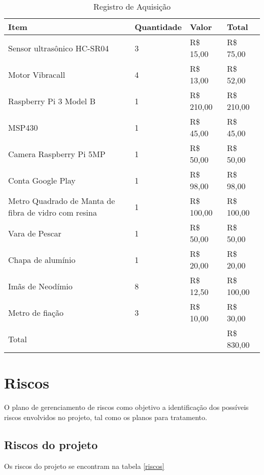 \begin{table}[ht]
    \centering
	\label{aqeletronica}
    \caption{Registro de Aquisição}
    \begin{tabular}{|p{2.0in}|p{0.8in}|p{0.7in}|p{1.0in}|}
        \hline
        Item & Quantidade & Valor & Total \\
        \hline
        Sensor ultrasônico HC-SR04 &  3 & R\$ 15,00 & R\$ 75,00 \\
        Motor Vibracall & 4 & R\$ 13,00 & R\$ 52,00 \\
        Raspberry Pi 3 Model B & 1 & R\$ 210,00 & R\$ 210,00 \\
        MSP430 & 1 & R\$ 45,00 & R\$ 45,00 \\
        Camera Raspberry Pi 5MP & 1 & R\$ 50,00 & R\$ 50,00 \\
        Conta Google Play & 1 & R\$ 98,00 & R\$ 98,00 \\
        Metro Quadrado de Manta de fibra de vidro com resina & 1 & R\$ 100,00 & R\$ 100,00 \\
        Vara de Pescar & 1 & R\$ 50,00 & R\$ 50,00 \\
        Chapa de alumínio & 1 & R\$ 20,00 & R\$ 20,00 \\
        Imãs de Neodímio & 8 & R\$ 12,50 & R\$ 100,00 \\
        Metro de fiação & 3 & R\$ 10,00  & R\$ 30,00 \\
        \hline
        Total & & & R\$ 830,00 \\
        \hline
    \end{tabular}
\end{table}

\section{Riscos}

O plano de gerenciamento de riscos como objetivo a identificação dos possíveis riscos envolvidos no projeto, tal como os planos para tratamento.


\subsection{Riscos do projeto}

Os riscos do projeto se encontram na tabela \ref{riscos}

